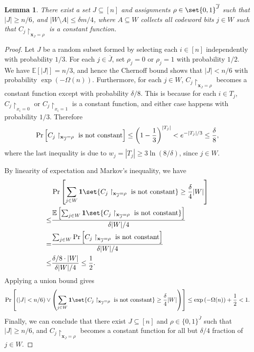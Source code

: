 \documentclass[10pt,a4paper]{article}
\newtheorem{lemma}{Lemma}
\theoremstyle{remark}
\newcommand{\zo}{\ensuremath{{\{0,1\}}}\xspace}
\newcommand{\tuple}[1]{\ensuremath{\left(#1\right)}}
\newcommand{\tp}{\tuple}
\def\*#1{\mathbf{#1}}
\providecommand{\E}{\ensuremath{\mathbb{E}}\xspace}
\begin{document}
\begin{lemma} \label{lem:random-restriction}
There exist a set $J \subseteq [n]$ and assignments $\rho \in \set{0,1}^{\overline{J}}$ such that $|J| \ge n/6$, and $|W \setminus A| \le \delta m/4$, where $A \subseteq W$ collects all codeword bits $j \in W$ such that $C_j \restriction_{\*x_{\overline{J}}=\rho}$ is a constant function.
\end{lemma}
\begin{proof}
Let $J$ be a random subset formed by selecting each $i \in [n]$ independently with probability $1/3$. For each $j \in \overline{J}$, set $\rho_j = 0$ or $\rho_j = 1$ with probability $1/2$. We have $\E[|J|]=n/3$, and hence the Chernoff bound shows that $|J| < n/6$ with probability $\exp(-\Omega(n))$. Furthermore, for each $j \in W$, $C_j\restriction_{\*x_{\overline{J}}=\rho}$ becomes a constant function except with probability $\delta/8$.  This is because for each $i \in T_j$, $C_j\restriction_{x_i=0}$ or $C_j\restriction_{x_i=1}$ is a constant function, and either case happens with probability $1/3$. Therefore
\begin{align*}
	\Pr\left[ C_j\restriction_{\*x_{\overline{J}}=\rho}\textup{ is not constant} \right] \le \tp{1-\frac{1}{3}}^{|T_j|} < e^{-|T_j|/3} \le \frac{\delta}{8}, 
\end{align*} 
where the last inequality is due to $w_j = |T_j| \ge 3\ln(8/\delta)$, since $j \in W$.

By linearity of expectation and Markov's inequality, we have
\begin{align*}
	  & \Pr\left[ \sum_{j \in W}\mathbf{1}\set{C_j\restriction_{\*x_{\overline{J}}=\rho}\textup{ is not constant}} \ge \frac{\delta}{4}|W| \right] \\
	\le& \frac{ \E\left[ \sum_{j \in W}\mathbf{1}\set{C_j\restriction_{\*x_{\overline{J}}=\rho}\textup{ is not constant}} \right]}{\delta|W|/4} \\
	=& \frac{\sum_{j \in W}\Pr\left[ C_j\restriction_{\*x_{\overline{J}}=\rho}\textup{ is not constant} \right]}{\delta|W|/4} \\
	\le& \frac{\delta/8 \cdot |W|}{\delta|W|/4} \le \frac{1}{2}.
\end{align*}
Applying a union bound gives
\begin{align*}
	\Pr\left[ \tp{|J| < n/6} \lor \tp{\sum_{j \in W}\mathbf{1}\set{C_j\restriction_{\*x_{\overline{J}}=\rho}\textup{ is not constant}} \ge \frac{\delta}{4}|W|} \right] \le \exp\tp{-\Omega(n)} + \frac{1}{2} < 1.
\end{align*}
Finally, we can conclude that there exist $J \subseteq [n]$ and $\rho\in\zo^{\overline{J}}$ such that $|J| \ge n/6$, and $C_j\restriction_{\*x_{\overline{J}}=\rho}$ becomes a constant function for all but $\delta/4$ fraction of $j \in W$. 
\end{proof}
\end{document}
